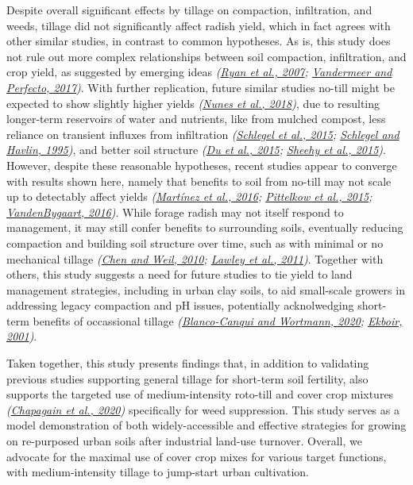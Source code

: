 \documentclass[
  12pt,
]{article}
\begin{document}
Despite overall significant effects by tillage on compaction, infiltration, and weeds, tillage did not significantly affect radish yield, which in fact agrees with other similar studies, in contrast to common hypotheses.
As is, this study does not rule out more complex relationships between soil compaction, infiltration, and crop yield, as suggested by emerging ideas \emph{(\protect\hyperlink{ref-ryan07}{Ryan et al., 2007}; \protect\hyperlink{ref-vandermeer17}{Vandermeer and Perfecto, 2017})}.
With further replication, future similar studies no-till might be expected to show slightly higher yields \emph{(\protect\hyperlink{ref-nunes18}{Nunes et al., 2018})}, due to resulting longer-term reservoirs of water and nutrients, like from mulched compost, less reliance on transient influxes from infiltration \emph{(\protect\hyperlink{ref-schlegel15}{Schlegel et al., 2015}; \protect\hyperlink{ref-schlegel95}{Schlegel and Havlin, 1995})}, and better soil structure \emph{(\protect\hyperlink{ref-du15}{Du et al., 2015}; \protect\hyperlink{ref-sheehy15}{Sheehy et al., 2015})}.
However, despite these reasonable hypotheses, recent studies appear to converge with results shown here, namely that benefits to soil from no-till may not scale up to detectably affect yields \emph{(\protect\hyperlink{ref-martinez16}{Martínez et al., 2016}; \protect\hyperlink{ref-pittelkow15}{Pittelkow et al., 2015}; \protect\hyperlink{ref-vandenbygaart16}{VandenBygaart, 2016})}.
While forage radish may not itself respond to management, it may still confer benefits to surrounding soils, eventually reducing compaction and building soil structure over time, such as with minimal or no mechanical tillage \emph{(\protect\hyperlink{ref-chen10b}{Chen and Weil, 2010}; \protect\hyperlink{ref-lawley11}{Lawley et al., 2011})}.
Together with others, this study suggests a need for future studies to tie yield to land management strategies, including in urban clay soils, to aid small-scale growers in addressing legacy compaction and pH issues, potentially acknolwedging short-term benefits of occassional tillage \emph{(\protect\hyperlink{ref-blanco-canqui20}{Blanco-Canqui and Wortmann, 2020}; \protect\hyperlink{ref-ekboir01}{Ekboir, 2001})}.

Taken together, this study presents findings that, in addition to validating previous studies supporting general tillage for short-term soil fertility, also supports the targeted use of medium-intensity roto-till and cover crop mixtures \emph{(\protect\hyperlink{ref-chapagain20}{Chapagain et al., 2020})} specifically for weed suppression.
This study serves as a model demonstration of both widely-accessible and effective strategies for growing on re-purposed urban soils after industrial land-use turnover.
Overall, we advocate for the maximal use of cover crop mixes for various target functions, with medium-intensity tillage to jump-start urban cultivation.
\end{document}
